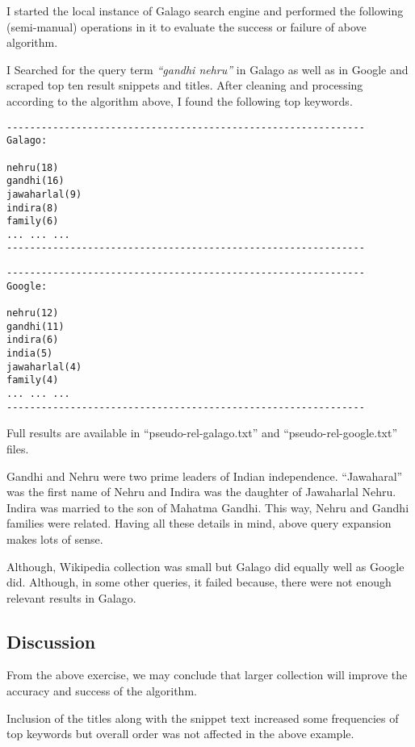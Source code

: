 \documentclass[letterpaper,12pt]{article}
\begin{document}
I started the local instance of Galago search engine and performed the following (semi-manual) operations in it to evaluate the success or failure of above algorithm.

I Searched for the query term \emph{``gandhi nehru''} in Galago as well as in Google and scraped top ten result snippets and titles. After cleaning and processing according to the algorithm above, I found the following top keywords.

\begin{verbatim}
--------------------------------------------------------------
Galago:

nehru(18)
gandhi(16)
jawaharlal(9)
indira(8)
family(6)
... ... ...
--------------------------------------------------------------
\end{verbatim}

\begin{verbatim}
--------------------------------------------------------------
Google:

nehru(12)
gandhi(11)
indira(6)
india(5)
jawaharlal(4)
family(4)
... ... ...
--------------------------------------------------------------
\end{verbatim}

Full results are available in ``pseudo-rel-galago.txt'' and ``pseudo-rel-google.txt'' files.

Gandhi and Nehru were two prime leaders of Indian independence. ``Jawaharal'' was the first name of Nehru and Indira was the daughter of Jawaharlal Nehru. Indira was married to the son of Mahatma Gandhi. This way, Nehru and Gandhi families were related. Having all these details in mind, above query expansion makes lots of sense.

Although, Wikipedia collection was small but Galago did equally well as Google did. Although, in some other queries, it failed because, there were not enough relevant results in Galago.


\subsection{Discussion}

From the above exercise, we may conclude that larger collection will improve the accuracy and success of the algorithm.

Inclusion of the titles along with the snippet text increased some frequencies of top keywords but overall order was not affected in the above example.

\pagebreak
\end{document}
